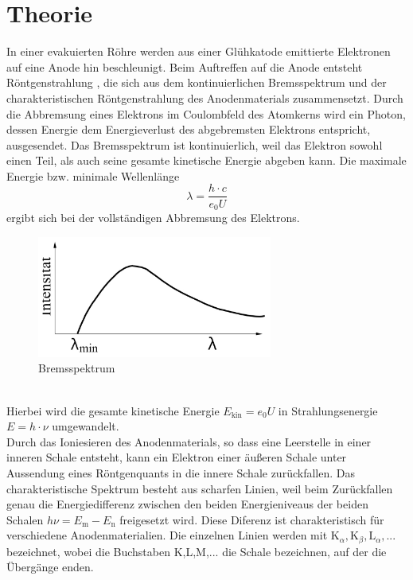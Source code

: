 \section{Theorie}
\label{sec:Theorie}
In einer evakuierten Röhre werden aus einer Glühkatode emittierte Elektronen auf eine Anode hin beschleunigt.
Beim Auftreffen auf die Anode entsteht Röntgenstrahlung , die sich aus dem kontinuierlichen Bremsspektrum
und der charakteristischen Röntgenstrahlung des Anodenmaterials zusammensetzt.
Durch die Abbremsung eines Elektrons im Coulombfeld des Atomkerns wird ein Photon,
dessen Energie dem Energieverlust des abgebremsten Elektrons entspricht,
ausgesendet.
Das Bremsspektrum ist kontinuierlich, weil das Elektron sowohl einen Teil, als auch seine gesamte kinetische Energie abgeben kann.
Die maximale Energie bzw. minimale Wellenlänge
\begin{equation}
    \lambda = \frac{h \cdot c}{e_0 U}
    \label{eqn:gl1}
\end{equation}
ergibt sich bei der vollständigen Abbremsung des Elektrons.
\begin{figure}
    \centering
    \includegraphics[height=4.0cm]{data/abb1.jpg}
    \caption{Bremsspektrum \cite{V602}}
    \label{fig:abb1}
\end{figure} \\
\noindent
Hierbei wird die gesamte kinetische Energie $E_{\text{kin}} = e_0 U$ in Strahlungsenergie $E = h \cdot \nu$ umgewandelt.\\
\noindent
Durch das Ioniesieren des Anodenmaterials, so dass eine Leerstelle in einer inneren Schale entsteht, kann ein Elektron einer äußeren Schale unter Aussendung eines Röntgenquants in die innere Schale zurückfallen.
Das charakteristische Spektrum besteht aus scharfen Linien, weil beim Zurückfallen genau die Energiedifferenz zwischen den beiden Energieniveaus der beiden Schalen $h \nu = E_{\text{m}} - E_{\text{n}}$ freigesetzt wird.
Diese Diferenz ist charakteristisch für verschiedene Anodenmaterialien.
Die einzelnen Linien werden mit $\text{K}_{\alpha}, \text{K}_{\beta}, \text{L}_{\alpha},...$ bezeichnet, wobei die Buchstaben K,L,M,... die Schale bezeichnen, auf der die Übergänge enden.
